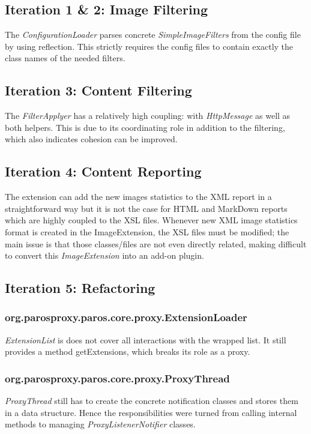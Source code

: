 \subsection{Iteration 1 \& 2: Image Filtering}
The \textit{ConfigurationLoader} parses concrete \textit{SimpleImageFilters} from the config file by using reflection. This strictly requires the config files to contain exactly the class names of the needed filters.
\subsection{Iteration 3: Content Filtering}
The \textit{FilterApplyer} has a relatively high coupling: with \textit{HttpMessage} as well as both helpers. This is due to its coordinating role in addition to the filtering, which also indicates cohesion can be improved.
\subsection{Iteration 4: Content Reporting}
The extension can add the new images statistics to the XML report in a straightforward way but it is not the case for HTML and MarkDown reports which are highly coupled to the XSL files. Whenever new XML image statistics format is created in the ImageExtension, the XSL files must be modified; the main issue is that those classes/files are not even directly related, making difficult to convert this \textit{ImageExtension} into an add-on plugin.

\subsection{Iteration 5: Refactoring}
\subsubsection{org.parosproxy.paros.core.proxy.ExtensionLoader}
\textit{ExtensionList} is does not cover all interactions with the wrapped list. It still provides a method getExtensions, which breaks its role as a proxy.
\subsubsection{org.parosproxy.paros.core.proxy.ProxyThread}

\textit{ProxyThread} still has to create the concrete notification classes and stores them in a data structure. Hence the responsibilities were turned from calling internal methods to managing \textit{ProxyListenerNotifier} classes.
